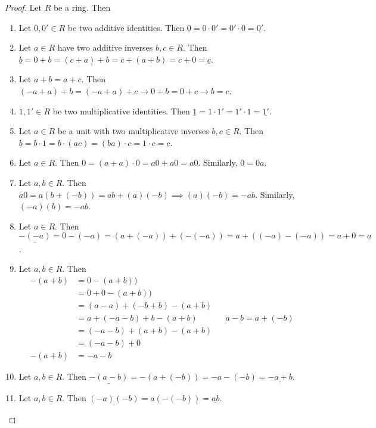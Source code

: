 \documentclass [12pt] {article}
\newcommand{\ul}[1]{\underline{{#1}}}
\begin{document}
\begin{proof}
    Let $R$ be a ring. Then
    \begin{enumerate}[label=(\arabic*)]
        \item Let $0, 0' \in R$ be two additive identities. Then 
            $\ul{0} = 0 \cdot 0' = 0' \cdot 0 = \ul{0'}$.
        \item Let $a \in R$ have two additive inverses $b, c \in R$. Then
            \newline
            $\ul{b} = 0 + b = (c + a) + b = c + (a + b) = c + 0 = \ul{c}$.
        \item Let $a + b = a + c$. Then $(-a + a) + b = (-a + a) + c \to 0 + b = 0 + c \to b = c$.
        \item $1, 1' \in R$ be two multiplicative identities. Then
            $\ul{1} = 1 \cdot 1' = 1' \cdot 1 = \ul{1'}$.
        \item Let $a \in R$ be a unit with two multiplicative inverses $b, c \in R$. Then
            \newline
            $\ul{b} = b \cdot 1 = b \cdot (ac) = (ba) \cdot c = 1 \cdot c = \ul{c}$.
        \item Let $a \in R$. Then $0 = (a + a) \cdot 0 = a0 + a0 = a0$. Similarly, $0 = 0a$.
        \item Let $a, b \in R$. Then $a0 = a(b + (-b)) = ab + (a)(-b) \implies (a)(-b) = -ab$.
            Similarly, $(-a)(b) = -ab$.
        \item Let $a \in R$. Then 
            \newline
            $\ul{-(-a)} = 0 - (-a) = (a + (-a)) + (-(-a)) = a + ((-a) - (-a)) = a + 0 = \ul{a}$.
        \item Let $a, b \in R$. Then
            \begin{align*}
                -(a + b) &= 0 - (a + b)) \\
                         &= 0 + 0 - (a + b)) \\
                         &= (a - a) + (-b + b) - (a + b) \\
                         &= a + (-a - b) + b - (a + b) && a - b = a + (-b) \\
                         &= (-a - b) + (a + b) - (a + b) \\
                         &= (-a - b) + 0 \\
                -(a + b) &= -a - b
            \end{align*}
        \item Let $a, b \in R$. Then $\ul{-(a - b)} = -(a + (-b)) = -a - (-b) = \ul{-a + b}$.
        \item Let $a, b \in R$. Then $\ul{(-a)(-b)} = a(-(-b)) = \ul{ab}$.
    \end{enumerate}
\end{proof}
\end{document}
